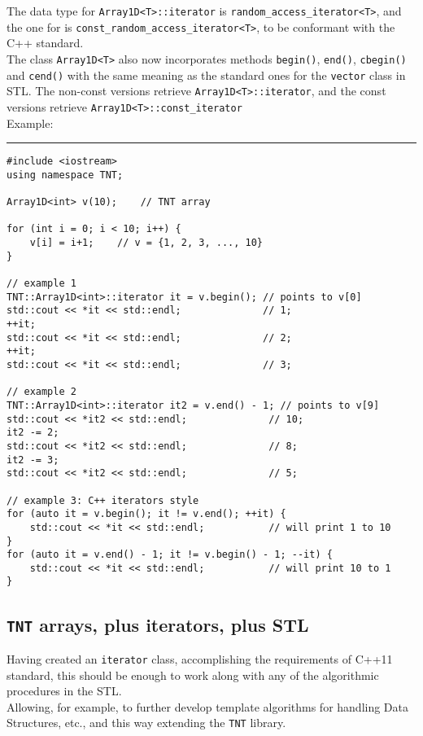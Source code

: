 The data type for {\tt Array1D<T>::iterator} is {\tt random\_access\_iterator<T>}, and the one for  is {\tt const\_random\_access\_iterator<T>}, to be conformant with the C++ standard.
\\

The class {\tt Array1D<T>} also now incorporates methods {\tt begin()}, {\tt end()}, {\tt cbegin()} and {\tt cend()} with the same meaning as the standard ones for the {\tt vector} class in STL. The non-const versions retrieve {\tt Array1D<T>::iterator}, and the const versions retrieve {\tt Array1D<T>::const\_iterator}
\\

Example:
\\
\rule{\textwidth}{0.5pt}
\begin{verbatim}
#include <iostream>
using namespace TNT;

Array1D<int> v(10);    // TNT array

for (int i = 0; i < 10; i++) {
    v[i] = i+1;    // v = {1, 2, 3, ..., 10}
}

// example 1
TNT::Array1D<int>::iterator it = v.begin(); // points to v[0]
std::cout << *it << std::endl;              // 1;
++it;
std::cout << *it << std::endl;              // 2;
++it;
std::cout << *it << std::endl;              // 3;

// example 2
TNT::Array1D<int>::iterator it2 = v.end() - 1; // points to v[9]
std::cout << *it2 << std::endl;              // 10;
it2 -= 2;
std::cout << *it2 << std::endl;              // 8;
it2 -= 3;
std::cout << *it2 << std::endl;              // 5;

// example 3: C++ iterators style
for (auto it = v.begin(); it != v.end(); ++it) {
    std::cout << *it << std::endl;           // will print 1 to 10
}
for (auto it = v.end() - 1; it != v.begin() - 1; --it) {
    std::cout << *it << std::endl;           // will print 10 to 1
}
\end{verbatim}

\subsection{{\tt TNT} arrays, plus iterators, plus STL}

Having created an {\tt iterator} class, accomplishing the requirements of C++11 standard, this should be enough to work along with any of the algorithmic procedures in the STL.
\\
Allowing, for example, to further develop template algorithms for handling Data Structures, etc., and this way extending the {\tt TNT} library.
\\

